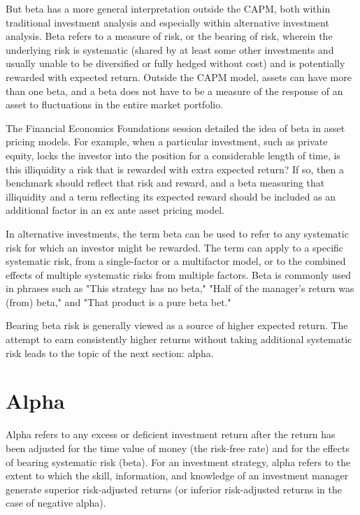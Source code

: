 \documentclass[11pt]{article}
\begin{document}
But beta has a more general interpretation outside the CAPM, both within traditional investment analysis and especially within alternative investment analysis. Beta refers to a measure of risk, or the bearing of risk, wherein the underlying risk is systematic (shared by at least some other investments and usually unable to be diversified or fully hedged without cost) and is potentially rewarded with expected return. Outside the CAPM model, assets can have more than one beta, and a beta does not have to be a measure of the response of an asset to fluctuations in the entire market portfolio.

The Financial Economics Foundations session detailed the idea of beta in asset pricing models. For example, when a particular investment, such as private equity, locks the investor into the position for a considerable length of time, is this illiquidity a risk that is rewarded with extra expected return? If so, then a benchmark should reflect that risk and reward, and a beta measuring that illiquidity and a term reflecting its expected reward should be included as an additional factor in an ex ante asset pricing model.

In alternative investments, the term beta can be used to refer to any systematic risk for which an investor might be rewarded. The term can apply to a specific systematic risk, from a single-factor or a multifactor model, or to the combined effects of multiple systematic risks from multiple factors. Beta is commonly used in phrases such as "This strategy has no beta," "Half of the manager's return was (from) beta," and "That product is a pure beta bet."

Bearing beta risk is generally viewed as a source of higher expected return. The attempt to earn consistently higher returns without taking additional systematic risk leads to the topic of the next section: alpha.

\section*{Alpha}
Alpha refers to any excess or deficient investment return after the return has been adjusted for the time value of money (the risk-free rate) and for the effects of bearing systematic risk (beta). For an investment strategy, alpha refers to the extent to which the skill, information, and knowledge of an investment manager generate superior risk-adjusted returns (or inferior risk-adjusted returns in the case of negative alpha).
\end{document}
